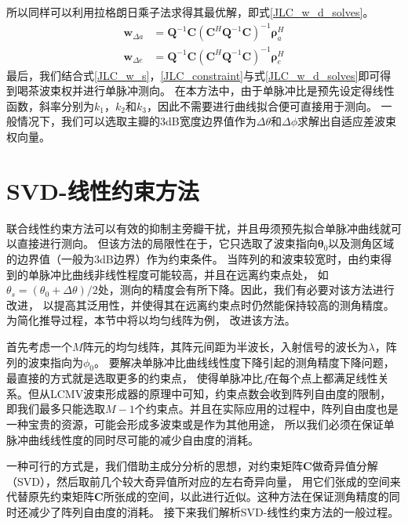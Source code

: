 \documentclass[master]{thesis-uestc}
\begin{document}
所以同样可以利用拉格朗日乘子法求得其最优解，即式\eqref{JLC_w_d_solves}。
\begin{subequations}\label{JLC_w_d_solves}
    \begin{align}
        \bm{w}_{\Delta a} &= \bm{Q}^{-1}\bm{C}\left(\bm{C}^H\bm{Q}^{-1}\bm{C}\right)^{-1}\bm{\rho}^H_a \\
        \bm{w}_{\Delta e} &= \bm{Q}^{-1}\bm{C}\left(\bm{C}^H\bm{Q}^{-1}\bm{C}\right)^{-1}\bm{\rho}^H_e
    \end{align}
\end{subequations}
最后，我们结合式\eqref{JLC_w_s}，\eqref{JLC_constraint}与式\eqref{JLC_w_d_solves}即可得到喝茶波束权并进行单脉冲测向。
在本方法中，由于单脉冲比是预先设定得线性函数，斜率分别为$k_1$，$k_2$和$k_3$，因此不需要进行曲线拟合便可直接用于测向。
一般情况下，我们可以选取主瓣的3dB宽度边界值作为$\Delta\theta$和$\Delta\phi$求解出自适应差波束权向量。

\section{SVD-线性约束方法}
联合线性约束方法可以有效的抑制主旁瓣干扰，并且毋须预先拟合单脉冲曲线就可以直接进行测向。
但该方法的局限性在于，它只选取了波束指向$\bm{\theta}_0$以及测角区域的边界值（一般为3dB边界）作为约束条件。
当阵列的和波束较宽时，由约束得到的单脉冲比曲线非线性程度可能较高，并且在远离约束点处，
如$\theta_s=(\theta_0+\Delta\theta)/2$处，测向的精度会有所下降。因此，我们有必要对该方法进行改进，
以提高其泛用性，并使得其在远离约束点时仍然能保持较高的测角精度。为简化推导过程，本节中将以均匀线阵为例，
改进该方法。

首先考虑一个$M$阵元的均匀线阵，其阵元间距为半波长，入射信号的波长为$\lambda$，阵列的波束指向为$\phi_0$。
要解决单脉冲比曲线线性度下降引起的测角精度下降问题，最直接的方式就是选取更多的约束点，
使得单脉冲比$f$在每个点上都满足线性关系。但从LCMV波束形成器的原理中可知，约束点数会收到阵列自由度的限制，
即我们最多只能选取$M-1$个约束点。并且在实际应用的过程中，阵列自由度也是一种宝贵的资源，可能会形成多波束或是作为其他用途，
所以我们必须在保证单脉冲曲线线性度的同时尽可能的减少自由度的消耗。

一种可行的方式是，我们借助主成分分析的思想，对约束矩阵$\bm{C}$做奇异值分解（SVD），然后取前几个较大奇异值所对应的左右奇异向量，
用它们张成的空间来代替原先约束矩阵$\bm{C}$所张成的空间，以此进行近似。这种方法在保证测角精度的同时还减少了阵列自由度的消耗。
接下来我们解析SVD-线性约束方法的一般过程。
\end{document}
